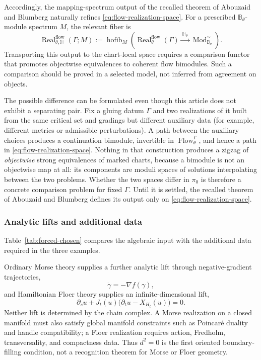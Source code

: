 \documentclass[11pt,letterpaper,twoside]{article}
\theoremstyle{plain}
\theoremstyle{definition}
\theoremstyle{remark}
\newcommand{\Real}{\operatorname{Real}}
\DeclareMathOperator{\hofib}{hofib}
\begin{document}
Accordingly, the mapping-spectrum output of the recalled theorem of Abouzaid and Blumberg naturally refines \eqref{eq:flow-realization-space}.  For a prescribed \(\mathbb B_\theta\)-module spectrum \(M\), the relevant fiber is
\begin{equation}\label{eq:flow-output-fiber}
 \Real_{\theta,\mathbb H}^{\mathrm{flow}}(\Gamma;M)
 :=\hofib_M\left(
 \Real_\theta^{\mathrm{flow}}(\Gamma)
 \xrightarrow{\ \mathbb H_\theta\ }
 \operatorname{Mod}_{\mathbb B_\theta}^{\simeq}
 \right).
\end{equation}
Transporting this output to the chart-local space requires a comparison functor that promotes objectwise equivalences to coherent flow bimodules.  Such a comparison should be proved in a selected model, not inferred from agreement on objects.

The possible difference can be formulated even though this article does not exhibit a separating pair.  Fix a gluing datum \(\Gamma\) and two realizations of it built from the same critical set and gradings but different auxiliary data (for example, different metrics or admissible perturbations).  A path between the auxiliary choices produces a continuation bimodule, invertible in \(\operatorname{Flow}_\theta^\Gamma\), and hence a path in \eqref{eq:flow-realization-space}.  Nothing in that construction produces a zigzag of \emph{objectwise} strong equivalences of marked charts, because a bimodule is not an objectwise map at all: its components are moduli spaces of solutions interpolating between the two problems.  Whether the two spaces differ in \(\pi_0\) is therefore a concrete comparison problem for fixed \(\Gamma\).  Until it is settled, the recalled theorem of Abouzaid and Blumberg defines its output only on \eqref{eq:flow-realization-space}.

\subsubsection{Analytic lifts and additional data}

Table~\ref{tab:forced-chosen} compares the algebraic input with the additional data required in the three examples.

Ordinary Morse theory supplies a further analytic lift through negative-gradient trajectories,
\[
 \dot\gamma=-\nabla f(\gamma),
\]
and Hamiltonian Floer theory supplies an infinite-dimensional lift,
\[
 \partial_su+J_t(u)\bigl(\partial_tu-X_{H_t}(u)\bigr)=0.
\]
Neither lift is determined by the chain complex.  A Morse realization on a closed manifold must also satisfy global manifold constraints such as Poincar\'e duality and handle compatibility; a Floer realization requires action, Fredholm, transversality, and compactness data.  Thus \(d^2=0\) is the first oriented boundary-filling condition, not a recognition theorem for Morse or Floer geometry.
\end{document}
